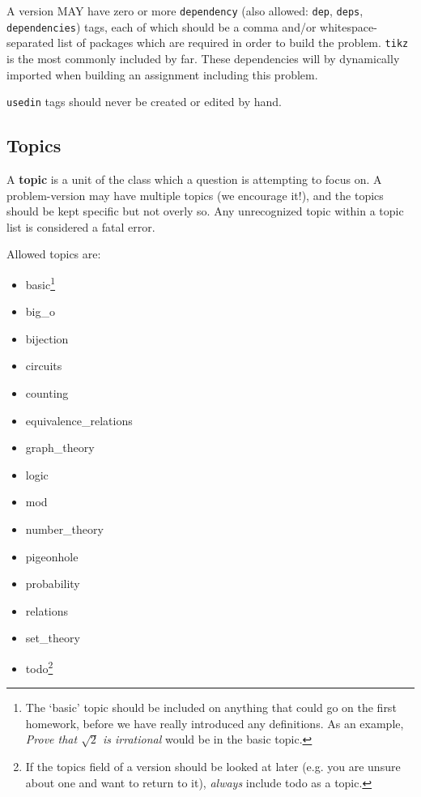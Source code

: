     A version MAY have zero or more \texttt{dependency} (also allowed: \texttt{dep}, \texttt{deps}, \texttt{dependencies}) tags, each of which should be a comma and/or whitespace-separated list of packages which are required in order to build the problem. \texttt{tikz} is the most commonly included by far. These dependencies will by dynamically imported when building an assignment including this problem.
    
    \texttt{usedin} tags should never be created or edited by hand.
  
  \subsection{Topics}
    A \textbf{topic} is a unit of the class which a question is attempting to focus on. A problem-version may have multiple topics (we encourage it!), and the topics should be kept specific but not overly so. Any unrecognized topic within a topic list is considered a fatal error.
    
    Allowed topics are:
    \begin{itemize}\itemsep0pt
      \item basic\footnote{The `basic' topic should be included on anything that could go on the first homework, before we have really introduced any definitions. As an example, \textit{Prove that $\sqrt 2$ is irrational} would be in the basic topic.}
      \item big\_o
      \item bijection
      \item circuits
      \item counting
      \item equivalence\_relations
      \item graph\_theory
      \item logic
      \item mod
      \item number\_theory
      \item pigeonhole
      \item probability
      \item relations
      \item set\_theory
      \item todo\footnote{If the topics field of a version should be looked at later (e.g. you are unsure about one and want to return to it), \textit{always} include todo as a topic.}
    \end{itemize}
    

